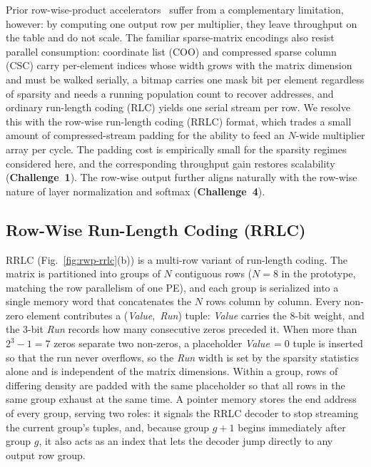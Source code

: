 \documentclass[lettersize,journal]{IEEEtran}
\begin{document}
Prior row-wise-product accelerators~\cite{Nitish2020MatRaptor} suffer from a complementary limitation, however: by computing one output row per multiplier, they leave throughput on the table and do not scale. The familiar sparse-matrix encodings also resist parallel consumption: coordinate list (COO) and compressed sparse column (CSC) carry per-element indices whose width grows with the matrix dimension and must be walked serially, a bitmap carries one mask bit per element regardless of sparsity and needs a running population count to recover addresses, and ordinary run-length coding (RLC) yields one serial stream per row. We resolve this with the row-wise run-length coding (RRLC) format, which trades a small amount of compressed-stream padding for the ability to feed an $N$-wide multiplier array per cycle. The padding cost is empirically small for the sparsity regimes considered here, and the corresponding throughput gain restores scalability (\textbf{Challenge~1}). The row-wise output further aligns naturally with the row-wise nature of layer normalization and softmax (\textbf{Challenge~4}).

\subsection{Row-Wise Run-Length Coding (RRLC)}
\label{sec:algo-rrlc}

RRLC (Fig.~\ref{fig:rwp-rrlc}(b)) is a multi-row variant of run-length coding. The matrix is partitioned into groups of $N$ contiguous rows ($N{=}8$ in the prototype, matching the row parallelism of one PE), and each group is serialized into a single memory word that concatenates the $N$ rows column by column. Every non-zero element contributes a (\textit{Value},~\textit{Run}) tuple: \textit{Value} carries the 8-bit weight, and the 3-bit \textit{Run} records how many consecutive zeros preceded it. When more than $2^{3}{-}1{=}7$ zeros separate two non-zeros, a placeholder \textit{Value}\,$=0$ tuple is inserted so that the run never overflows, so the \textit{Run} width is set by the sparsity statistics alone and is independent of the matrix dimensions. Within a group, rows of differing density are padded with the same placeholder so that all rows in the same group exhaust at the same time. A pointer memory stores the end address of every group, serving two roles: it signals the RRLC decoder to stop streaming the current group's tuples, and, because group $g{+}1$ begins immediately after group $g$, it also acts as an index that lets the decoder jump directly to any output row group.
\end{document}
